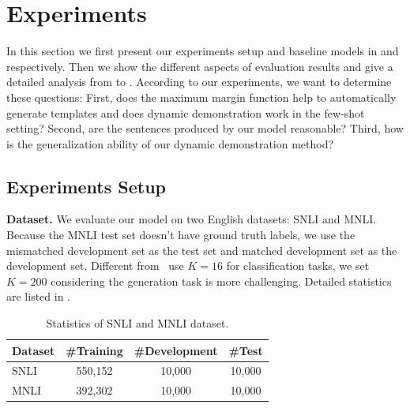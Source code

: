 \section{Experiments}
In this section we first present our experiments setup and baseline models in  and  respectively. Then we show the different aspects of evaluation results and give a detailed analysis from  to . According to our experiments, we want to determine these questions: First, does the maximum margin function help to automatically generate templates and does dynamic demonstration work in the few-shot setting? Second, are the sentences produced by our model reasonable? Third, how is the generalization ability of our dynamic demonstration method?

\subsection{Experiments Setup}
\noindent
\textbf{Dataset.} We evaluate our model on two English datasets: SNLI and MNLI. Because the MNLI test set doesn't have ground truth labels, we use the mismatched development set as the test set and matched development set as the development set. Different from~\citet{DBLP:conf/acl/GaoFC20} use $K=16$ for classification tasks, we set $K=200$ considering the generation task is more challenging. Detailed statistics are listed in . 
\label{sec:exp}
\begin{table}[!h]
	\centering
	\small
	\begin{tabular}{l|ccc}
		\toprule
		\textbf{Dataset} & \textbf{\#Training} & \textbf{\#Development} & \textbf{\#Test}\\
		\midrule
		SNLI  & 550,152 &  10,000 & 10,000 \\
		MNLI   & 392,302 &  10,000 & 10,000 \\
		\bottomrule
	\end{tabular}
	\caption{Statistics of SNLI and MNLI dataset.}
	\label{table:dataset}
\end{table}

